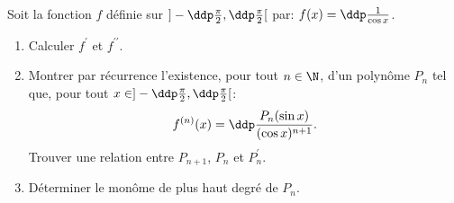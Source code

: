 \documentclass[a4paper, 11pt,reqno]{article}
\begin{document}
\begin{exercice}
	Soit la fonction $f$ d\'efinie sur $\rbrack -\ddp\frac{\pi}{2},\ddp\frac{\pi}{2}\lbrack$ par: $f(x)=\ddp\frac{1}{\cos{x}}$.
	\begin{enumerate}
		\item Calculer $f^{\prime}$ et $f^{\prime\prime}$.
		\item Montrer par r\'ecurrence l'existence, pour tout $n\in\N$, d'un polyn\^ome $P_n$ tel que, pour tout $x\in\rbrack -\ddp\frac{\pi}{2},\ddp\frac{\pi}{2}\lbrack$:
		      $$f^{(n)}(x)=\ddp\frac{P_n(\sin{x})}{(\cos{x})^{n+1}}.$$
		      Trouver une relation entre $P_{n+1}$, $P_n$ et $P^{\prime}_n$.
		\item D\'eterminer le mon\^ome de plus haut degr\'e de $P_n$.
	\end{enumerate}
\end{exercice}
\end{document}
